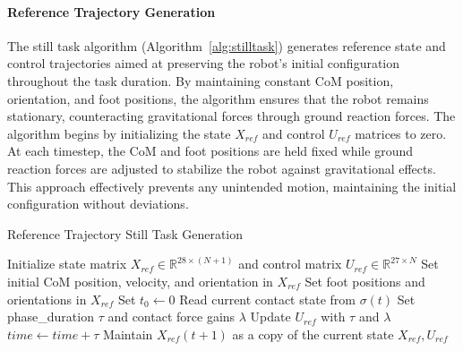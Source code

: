 \documentclass[main.tex]{subfiles}
\begin{document}
\begin{sloppypar}
\paragraph{Reference Trajectory Generation}  
The still task algorithm (Algorithm~\ref{alg:stilltask}) generates reference state and control trajectories aimed at preserving the robot’s initial configuration throughout the task duration. By maintaining constant CoM position, orientation, and foot positions, the algorithm ensures that the robot remains stationary, counteracting gravitational forces through ground reaction forces. The algorithm begins by initializing the state \( X_{ref} \) and control \( U_{ref} \) matrices to zero. At each timestep, the CoM and foot positions are held fixed while ground reaction forces are adjusted to stabilize the robot against gravitational effects. This approach effectively prevents any unintended motion, maintaining the initial configuration without deviations.\\
\begin{algorithm}[H]
\caption{Reference Trajectory Still Task Generation}
\label{alg:stilltask}
\begin{algorithmic}[1]
\State Initialize state matrix \( X_{ref} \in \mathbb{R}^{28 \times (N+1)} \) and control matrix \( U_{ref} \in \mathbb{R}^{27 \times N} \)
\State Set initial CoM position, velocity, and orientation in \( X_{ref} \)
\State Set foot positions and orientations in \( X_{ref} \)
\State Set $t_0 \gets 0$
    \State Read current contact state from \( \sigma(t) \)
    \State Set phase\_duration $\tau$ and contact force gains $\lambda$
    \State Update \( U_{ref} \) with $\tau$ and $\lambda$
    \State $time \leftarrow time + \tau$
    \State Maintain \( X_{ref}(t+1) \) as a copy of the current state
\EndFor
\State \Return \( X_{ref}, U_{ref} \)
\end{algorithmic}
\end{algorithm}

\end{sloppypar}
\end{document}
